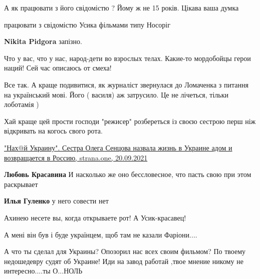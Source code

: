 \begin{itemize}
А як працювати з його свідомістю ? Йому ж не 15 років. Цікава ваша думка

працювати з свідомістю Усика фільмами типу Носоріг

\begin{itemize} %
\textbf{Nikita Pidgora} запізно.
\end{itemize} %

Что у вас, что у нас, народ-дети во взрослых телах. Какие-то мордобойцы герои наций! Сей час описаюсь от смеха!


Все так. А краще подивитися, як журналіст звернулася до Ломаченка з питання на
український мові. Його ( василя) аж затрусило. Це не лічеться, тільки лоботамія
)


Хай краще цей прости господи "режисер" розбереться із своєю сестрою перш ніж
відкривать на когось свого рота. 

\href{https://strana.one/news/354204-sestra-sentsova-nazvala-zhizn-v-ukraine-adom-i-vozvrashchaetsja-v-rossiju.html}{%
"Нах@й Украину". Сестра Олега Сенцова назвала жизнь в Украине адом и возвращается в Россию, strana.one, 20.09.2021%
}

\begin{itemize} %
\textbf{Любовь Красавина}
И насколько же оно бессловесное, что пасть свою при этом раскрывает

\textbf{Илья Гуленко} у него совести нет
\end{itemize} %

Ахинею несете вы, когда открываете рот! А Усик-красавец!

А мені він був і буде українцем, щоб там не казали Фаріони....


А что ты сделал для Украины? Опозорил нас всех своим фильмом? По твоему
недошедевру судят об Украине! Иди на завод работай ,твое мнение никому не
интересно....ты О...НОЛЬ

\end{itemize} %
